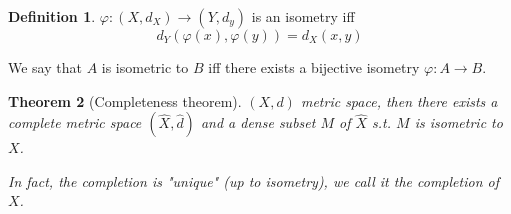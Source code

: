 \documentclass[11pt,a4paper]{article}
\theoremstyle{definition}
\newtheorem{definition}{Definition}[section]
\theoremstyle{plain}
\newtheorem{theorem}[definition]{Theorem}
\theoremstyle{remark}
\newcommand{\1}{\mathbbm{1}}
\begin{document}
\begin{definition}
    $\varphi \colon (X, d_X) \to (Y,d_y)$ is an isometry iff 
    $$d_Y(\varphi(x), \varphi(y)) = d_X(x,y)$$ 
    
    We say that $A$ is isometric to $B$ iff there exists a bijective isometry $\varphi \colon A \to B$.
\end{definition}


\begin{theorem}[Completeness theorem]
    $(X,d)$ metric space, then there exists a complete metric space $(\hat{X}, \hat{d})$ and a dense subset $M$ of $\hat{X}$ s.t. $M$ is isometric to $X$.  

    In fact, the completion is "unique" (up to isometry), we call it the completion of $X$.
\end{theorem}
\end{document}
